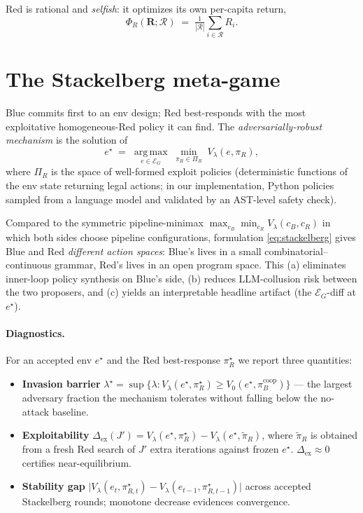 \documentclass[11pt]{article}
\newcommand{\Egram}{\mathcal{E}_G}
\newcommand{\policyset}{\Pi_R}
\newcommand{\bluepol}{\pi_B^{\text{coop}}}
\newcommand{\Welfare}{\Phi}
\begin{document}
Red is rational and \emph{selfish}: it optimizes its own
per-capita return,
\begin{equation}
\label{eq:redobj}
  \Welfare_R(\mathbf{R}; \mathcal{R})
  \;=\;
  \tfrac{1}{|\mathcal{R}|}
    \sum_{i \in \mathcal{R}} R_i.
\end{equation}

\section{The Stackelberg meta-game}
\label{sec:stackelberg}

Blue commits first to an env design; Red best-responds with the
most exploitative homogeneous-Red policy it can find.  The
\emph{adversarially-robust mechanism} is the solution of
\begin{equation}
\label{eq:stackelberg}
  e^\star
  \;=\;
  \operatorname*{arg\,max}_{e \in \Egram}\;
  \min_{\pi_R \in \policyset}\;
  V_\lambda(e, \pi_R),
\end{equation}
where $\policyset$ is the space of well-formed exploit policies
(deterministic functions of the env state returning legal
actions; in our implementation, Python policies sampled from a
language model and validated by an AST-level safety check).

Compared to the symmetric pipeline-minimax
$\max_{c_B} \min_{c_R} V_\lambda(c_B, c_R)$
in which both sides choose pipeline configurations,
formulation \eqref{eq:stackelberg} gives Blue and Red
\emph{different action spaces}: Blue's lives in a small
combinatorial--continuous grammar, Red's lives in an open
program space.  This (a) eliminates inner-loop policy synthesis
on Blue's side, (b) reduces LLM-collusion risk between the two
proposers, and (c) yields an interpretable headline artifact
(the $\Egram$-diff at $e^\star$).

\paragraph{Diagnostics.}
For an accepted env $e^\star$ and the Red best-response
$\pi_R^\star$ we report three quantities:
\begin{itemize}[itemsep=2pt, topsep=2pt]
  \item \textbf{Invasion barrier}
        $\lambda^\star =
         \sup\{\lambda : V_\lambda(e^\star, \pi_R^\star)
                       \ge V_0(e^\star, \bluepol)\}$
        — the largest adversary fraction the mechanism tolerates
        without falling below the no-attack baseline.
  \item \textbf{Exploitability}
        $\Delta_{\text{ex}}(J')
         = V_\lambda(e^\star, \pi_R^\star)
         - V_\lambda(e^\star, \tilde{\pi}_R)$,
        where $\tilde{\pi}_R$ is obtained from a fresh Red search
        of $J'$ extra iterations against frozen $e^\star$.
        $\Delta_{\text{ex}} \approx 0$ certifies near-equilibrium.
  \item \textbf{Stability gap}
        $\bigl| V_\lambda(e_t, \pi_{R,t}^\star)
              - V_\lambda(e_{t-1}, \pi_{R,t-1}^\star) \bigr|$
        across accepted Stackelberg rounds; monotone decrease
        evidences convergence.
\end{itemize}
\end{document}
